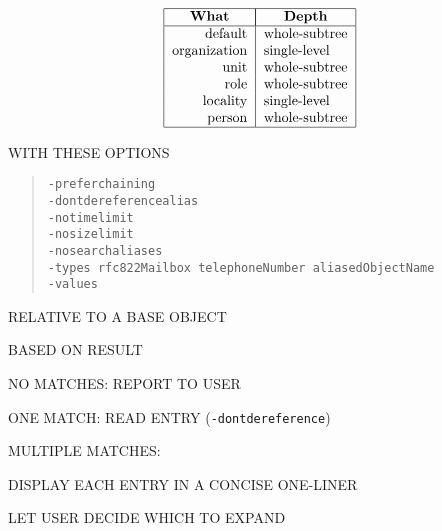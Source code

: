 \begin{bwslide}

\[\begin{tabular}{|r|l|}
\hline
\multicolumn{1}{|c|}{\bf What}&
		\multicolumn{1}{|c|}{\bf Depth}\\
\hline
default&	whole-subtree\\
organization&	single-level\\
unit&		whole-subtree\\
role&		whole-subtree\\
locality&	single-level\\
person&		whole-subtree\\
\hline
\end{tabular}\]
\end{bwslide}


\begin{bwslide}

\begin{nrtc}
\item	WITH THESE OPTIONS
\begin{quote}\small\begin{verbatim}
-preferchaining
-dontdereferencealias
-notimelimit
-nosizelimit
-nosearchaliases
-types rfc822Mailbox telephoneNumber aliasedObjectName
-values
\end{verbatim}\end{quote}

\item	RELATIVE TO A BASE OBJECT

\item	BASED ON RESULT
    \begin{nrtc}
    \item	NO MATCHES: REPORT TO USER

    \item	ONE MATCH: READ ENTRY (\verb"-dontdereference")

    \item	MULTIPLE MATCHES:
	\begin{nrtc}
	\item	DISPLAY EACH ENTRY IN A CONCISE ONE-LINER

	\item	LET USER DECIDE WHICH TO EXPAND
	\end{nrtc}
    \end{nrtc}
\end{nrtc}
\end{bwslide}


